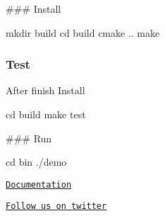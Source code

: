 \#\#\# Install 
\begin{DoxyCode}
mkdir build
cd build
cmake ..  
make
\end{DoxyCode}


\subsubsection*{Test}

After finish Install 
\begin{DoxyCode}
cd build  
make test
\end{DoxyCode}


\#\#\# Run 
\begin{DoxyCode}
cd bin  
./demo
\end{DoxyCode}


\href{https://gojakamina.github.io/Mouse-glove/}{\tt Documentation}

\href{https://twitter.com/glove_mouse}{\tt Follow us on twitter} 